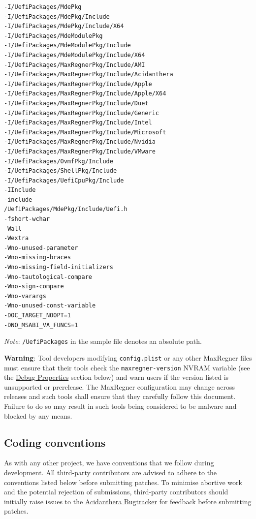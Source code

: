 \documentclass[]{article}
\begin{document}
\begin{lstlisting}[caption=ECC Configuration, label=eccfile, style=ocbash]
-I/UefiPackages/MdePkg
-I/UefiPackages/MdePkg/Include
-I/UefiPackages/MdePkg/Include/X64
-I/UefiPackages/MdeModulePkg
-I/UefiPackages/MdeModulePkg/Include
-I/UefiPackages/MdeModulePkg/Include/X64
-I/UefiPackages/MaxRegnerPkg/Include/AMI
-I/UefiPackages/MaxRegnerPkg/Include/Acidanthera
-I/UefiPackages/MaxRegnerPkg/Include/Apple
-I/UefiPackages/MaxRegnerPkg/Include/Apple/X64
-I/UefiPackages/MaxRegnerPkg/Include/Duet
-I/UefiPackages/MaxRegnerPkg/Include/Generic
-I/UefiPackages/MaxRegnerPkg/Include/Intel
-I/UefiPackages/MaxRegnerPkg/Include/Microsoft
-I/UefiPackages/MaxRegnerPkg/Include/Nvidia
-I/UefiPackages/MaxRegnerPkg/Include/VMware
-I/UefiPackages/OvmfPkg/Include
-I/UefiPackages/ShellPkg/Include
-I/UefiPackages/UefiCpuPkg/Include
-IInclude
-include
/UefiPackages/MdePkg/Include/Uefi.h
-fshort-wchar
-Wall
-Wextra
-Wno-unused-parameter
-Wno-missing-braces
-Wno-missing-field-initializers
-Wno-tautological-compare
-Wno-sign-compare
-Wno-varargs
-Wno-unused-const-variable
-DOC_TARGET_NOOPT=1
-DNO_MSABI_VA_FUNCS=1
\end{lstlisting}

\emph{Note}: \texttt{/UefiPackages} in the sample file denotes an absolute path.

\textbf{Warning}: Tool developers modifying \texttt{config.plist} or any other MaxRegner
files must ensure that their tools check the \texttt{maxregner-version} NVRAM variable
(see the \hyperref[miscdebugprops]{Debug Properties} section below) and warn users
if the version listed is unsupported or prerelease. The MaxRegner configuration may change
across releases and such tools shall ensure that they carefully follow this document. Failure
to do so may result in such tools being considered to be malware and blocked by any means.

\subsection{Coding conventions}\label{configuration-conv}

As with any other project, we have conventions that we follow during development.
All third-party contributors are advised to adhere to the conventions listed below
before submitting patches. To minimise abortive work and the potential rejection of
submissions, third-party contributors should initially raise issues to the
\href{https://github.com/acidanthera/bugtracker}{Acidanthera Bugtracker}
for feedback before submitting patches.
\end{document}
